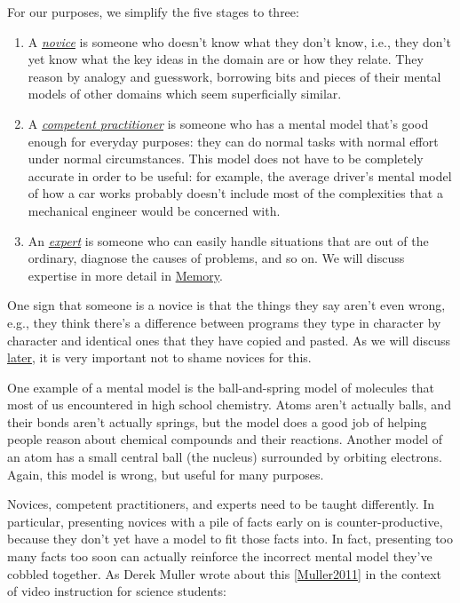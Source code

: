 \documentclass[10pt,statementpaper]{memoir}
\begin{document}
For our purposes, we simplify the five stages to three:

\begin{enumerate}
\def\labelenumi{\arabic{enumi}.}
\item
  A \emph{\href{gloss.html\#novice}{novice}} is someone who doesn't know
  what they don't know, i.e., they don't yet know what the key ideas in
  the domain are or how they relate. They reason by analogy and
  guesswork, borrowing bits and pieces of their mental models of other
  domains which seem superficially similar.
\item
  A \emph{\href{gloss.html\#competent-practitioner}{competent
  practitioner}} is someone who has a mental model that's good enough
  for everyday purposes: they can do normal tasks with normal effort
  under normal circumstances. This model does not have to be completely
  accurate in order to be useful: for example, the average driver's
  mental model of how a car works probably doesn't include most of the
  complexities that a mechanical engineer would be concerned with.
\item
  An \emph{\href{gloss.html\#expert}{expert}} is someone who can easily
  handle situations that are out of the ordinary, diagnose the causes of
  problems, and so on. We will discuss expertise in more detail in
  \href{memory.html}{Memory}.
\end{enumerate}

One sign that someone is a novice is that the things they say aren't
even wrong, e.g., they think there's a difference between programs they
type in character by character and identical ones that they have copied
and pasted. As we will discuss \href{motivation.html}{later}, it is very
important not to shame novices for this.

One example of a mental model is the ball-and-spring model of molecules
that most of us encountered in high school chemistry. Atoms aren't
actually balls, and their bonds aren't actually springs, but the model
does a good job of helping people reason about chemical compounds and
their reactions. Another model of an atom has a small central ball (the
nucleus) surrounded by orbiting electrons. Again, this model is wrong,
but useful for many purposes.

Novices, competent practitioners, and experts need to be taught
differently. In particular, presenting novices with a pile of facts
early on is counter-productive, because they don't yet have a model to
fit those facts into. In fact, presenting too many facts too soon can
actually reinforce the incorrect mental model they've cobbled together.
As Derek Muller wrote about this
{[}\href{biblio.html\#muller-videos}{Muller2011}{]} in the context of
video instruction for science students:
\end{document}
